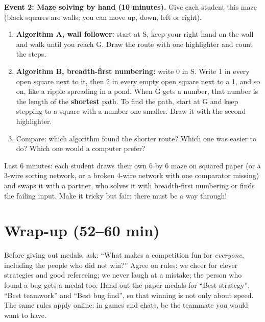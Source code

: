 \textbf{Event 2: Maze solving by hand (10 minutes).} Give each student this maze (black squares are walls; you can move up, down, left or right).
\begin{center}
\end{center}
\begin{enumerate}[itemsep=2pt]
  \item \textbf{Algorithm A, wall follower:} start at S, keep your right hand on the wall and walk until you reach G. Draw the route with one highlighter and count the steps.
  \item \textbf{Algorithm B, breadth-first numbering:} write 0 in S. Write 1 in every open square next to it, then 2 in every empty open square next to a 1, and so on, like a ripple spreading in a pond. When G gets a number, that number is the length of the \textbf{shortest} path. To find the path, start at G and keep stepping to a square with a number one smaller. Draw it with the second highlighter.
  \item Compare: which algorithm found the shorter route? Which one was easier to do? Which one would a computer prefer?
\end{enumerate}

\begin{freebuild}
Last 6 minutes: each student draws their own 6 by 6 maze on squared paper (or a 3-wire sorting network, or a broken 4-wire network with one comparator missing) and swaps it with a partner, who solves it with breadth-first numbering or finds the failing input. Make it tricky but fair: there must be a way through!
\end{freebuild}

\section{Wrap-up (52--60 min)}
\begin{safety}
Before giving out medals, ask: \enquote{What makes a competition fun for \emph{everyone}, including the people who did not win?} Agree on rules: we cheer for clever strategies and good refereeing; we never laugh at a mistake; the person who found a bug gets a medal too. Hand out the paper medals for \enquote{Best strategy}, \enquote{Best teamwork} and \enquote{Best bug find}, so that winning is not only about speed. The same rules apply online: in games and chats, be the teammate you would want to have.
\end{safety}

